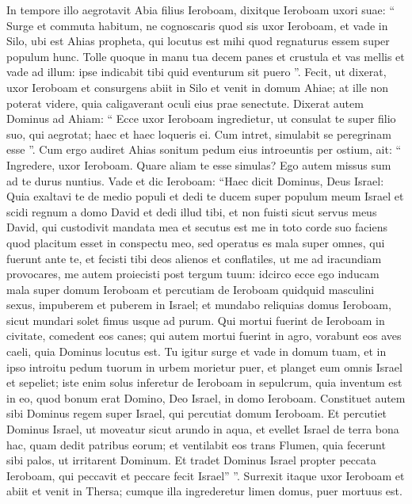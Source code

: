 \begin{biblechapter}
\begin{biblechapter}
\begin{biblechapter}
\begin{biblechapter}
\begin{biblechapter}
\begin{biblechapter}
\begin{biblechapter}
\begin{biblechapter}
\begin{biblechapter}
\begin{biblechapter}
\begin{biblechapter}
\begin{biblechapter}
\begin{biblechapter}
\begin{biblechapter}
 \verse In tempore illo aegrotavit Abia filius Ieroboam, 
 \verse dixitque Ieroboam uxori suae: “ Surge et commuta habitum, ne cognoscaris quod sis uxor Ieroboam, et vade in Silo, ubi est Ahias propheta, qui locutus est mihi quod regnaturus essem super populum hunc. 
\verse Tolle quoque in manu tua decem panes et crustula et vas mellis et vade ad illum: ipse indicabit tibi quid eventurum sit puero ”. 
 \verse Fecit, ut dixerat, uxor Ieroboam et consurgens abiit in Silo et venit in domum Ahiae; at ille non poterat videre, quia caligaverant oculi eius prae senectute.
 \verse Dixerat autem Dominus ad Ahiam: “ Ecce uxor Ieroboam ingredietur, ut consulat te super filio suo, qui aegrotat; haec et haec loqueris ei. Cum intret, simulabit se peregrinam esse ”.
 \verse Cum ergo audiret Ahias sonitum pedum eius introeuntis per ostium, ait: “ Ingredere, uxor Ieroboam. Quare aliam te esse simulas? Ego autem missus sum ad te durus nuntius. 
\verse Vade et dic Ieroboam: “Haec dicit Dominus, Deus Israel: Quia exaltavi te de medio populi et dedi te ducem super populum meum Israel 
\verse et scidi regnum a domo David et dedi illud tibi, et non fuisti sicut servus meus David, qui custodivit mandata mea et secutus est me in toto corde suo faciens quod placitum esset in conspectu meo, 
 \verse sed operatus es mala super omnes, qui fuerunt ante te, et fecisti tibi deos alienos et conflatiles, ut me ad iracundiam provocares, me autem proiecisti post tergum tuum: 
\verse idcirco ecce ego inducam mala super domum Ieroboam et percutiam de Ieroboam quidquid masculini sexus, impuberem et puberem in Israel; et mundabo reliquias domus Ieroboam, sicut mundari solet fimus usque ad purum. 
 \verse Qui mortui fuerint de Ieroboam in civitate, comedent eos canes; qui autem mortui fuerint in agro, vorabunt eos aves caeli, quia Dominus locutus est. 
 \verse Tu igitur surge et vade in domum tuam, et in ipso introitu pedum tuorum in urbem morietur puer, 
\verse et planget eum omnis Israel et sepeliet; iste enim solus inferetur de Ieroboam in sepulcrum, quia inventum est in eo, quod bonum erat Domino, Deo Israel, in domo Ieroboam. 
\verse Constituet autem sibi Dominus regem super Israel, qui percutiat domum Ieroboam. 
\verse Et percutiet Dominus Israel, ut moveatur sicut arundo in aqua, et evellet Israel de terra bona hac, quam dedit patribus eorum; et ventilabit eos trans Flumen, quia fecerunt sibi palos, ut irritarent Dominum. 
\verse Et tradet Dominus Israel propter peccata Ieroboam, qui peccavit et peccare fecit Israel” ”.
 \verse Surrexit itaque uxor Ieroboam et abiit et venit in Thersa; cumque illa ingrederetur limen domus, puer mortuus est. 

\end{biblechapter}
\end{biblechapter}
\end{biblechapter}
\end{biblechapter}
\end{biblechapter}
\end{biblechapter}
\end{biblechapter}
\end{biblechapter}
\end{biblechapter}
\end{biblechapter}
\end{biblechapter}
\end{biblechapter}
\end{biblechapter}
\end{biblechapter}
